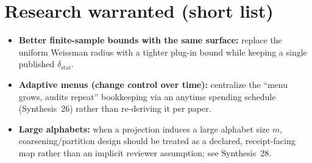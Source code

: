 \documentclass[11pt]{article}
\begin{document}
\section{Research warranted (short list)}
\begin{itemize}[leftmargin=*]
\item \textbf{Better finite-sample bounds with the same surface:} replace the uniform Weissman radius with a tighter plug-in bound while keeping a single published $\delta_{\mathrm{stat}}$.
\item \textbf{Adaptive menus (change control over time):} centralize the ``menu grows, audits repeat'' bookkeeping via an anytime spending schedule (Synthesis~26) rather than re-deriving it per paper.\cite{series:anytimespend}
\item \textbf{Large alphabets:} when a projection induces a large alphabet size $m$, coarsening/partition design should be treated as a declared, receipt-facing map rather than an implicit reviewer assumption; see Synthesis~28.\cite{series:coarsening}
\end{itemize}
\end{document}
